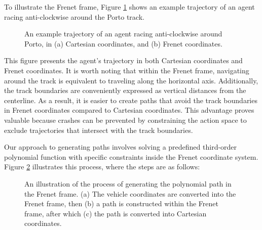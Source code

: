 To illustrate the Frenet frame, Figure \ref{fig:frenet_frame} shows an example trajectory of an agent racing anti-clockwise around the Porto track. 
\begin{figure}[b]
    \centering
    
    \caption[An example of a trajectory in Cartestian and Frenet coordinates]{An example trajectory of an agent racing anti-clockwise around Porto, in (a) Cartesian coordinates, and (b) Frenet coordinates.}
    \label{fig:frenet_frame}
\end{figure}
This figure presents the agent's trajectory in both Cartesian coordinates and Frenet coordinates. 
It is worth noting that within the Frenet frame, navigating around the track is equivalent to traveling along the horizontal axis. 
Additionally, the track boundaries are conveniently expressed as vertical distances from the centerline. 
As a result, it is easier to create paths that avoid the track boundaries in Frenet coordinates compared to Cartesian coordinates. 
This advantage proves valuable because crashes can be prevented by constraining the action space to exclude trajectories that intersect with the track boundaries.


Our approach to generating paths involves solving a predefined third-order polynomial function with specific constraints inside the Frenet coordinate system.
Figure \ref{fig:polynomial_path_generation} illustrates this process, where the steps are as follows: 

\begin{figure}[b]
    \centering
    
    \caption[Generating the path in the Frenet frame]{An illustration of the process of generating the polynomial path in the Frenet frame. (a) The vehicle coordinates are converted into the Frenet frame, then (b) a path is constructed within the Frenet frame, after which (c) the path is converted into Cartesian coordinates.}
    \label{fig:polynomial_path_generation}
\end{figure}

